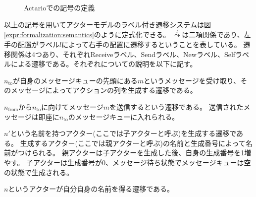 \begin{figure}
  
  \label{code:formalization:config}
  \caption{Actarioでの記号の定義}
\end{figure}

以上の記号を用いてアクターモデルのラベル付き遷移システムは図\ref{expr:formalization:semantics}のように定式化できる。
$\overset{l}{\leadsto}$は二項関係であり、左手の配置がラベル$l$によって右手の配置に遷移するということを表している。
遷移関係は4つあり、それぞれ\textsf{Receive}ラベル、\textsf{Send}ラベル、\textsf{New}ラベル、\textsf{Self}ラベルによる遷移である。それぞれについての説明を以下に記す。

\begin{description}[style=nextline,leftmargin=12pt,parsep=0pt]
\item[$\textsf{Receive}(n_{\textrm{to}}, m)$]
  $n_{\textrm{to}}$が自身のメッセージキューの先頭にある$m$というメッセージを受け取り、そのメッセージによってアクションの列を生成する遷移である。
\item[$\textsf{Send}(n_{\textrm{from}}, n_{\textrm{to}}, m)$]
  $n_{\textrm{from}}$から$n_{\textrm{to}}$に向けてメッセージ$m$を送信するという遷移である。
  送信されたメッセージは即座に$n_{\textrm{to}}$のメッセージキューに入れられる。
\item[$\textsf{New}(n')$]
  $n'$という名前を持つアクター(ここでは子アクターと呼ぶ)を生成する遷移である。
  生成するアクター(ここでは親アクターと呼ぶ)の名前と生成番号によって名前がつけられる。
  親アクターは子アクターを生成した後、自身の生成番号を1増やす。
  子アクターは生成番号が0、メッセージ待ち状態でメッセージキューは空の状態で生成される。
\item[$\textsf{Self}(n)$]
  $n$というアクターが自分自身の名前を得る遷移である。
\end{description}


